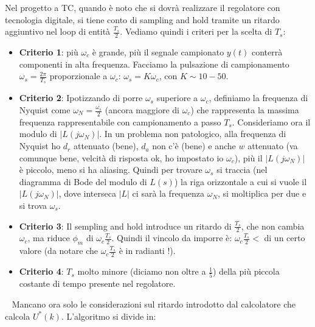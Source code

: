 \begin{landscape}
\begin{multicols*}{2}
    Nel progetto a TC, quando è noto che si dovrà realizzare il regolatore con tecnologia digitale, si tiene conto di sampling and hold tramite un ritardo aggiuntivo nel loop di entità $\frac{T_s}{2}$.\newline
    \newline
    Vediamo quindi i criteri per la scelta di $T_s$:
    \begin{itemize}
        \item \textbf{Criterio 1}: più $\omega_c$ è grande, più il segnale campionato $y(t)$ conterrà componenti in alta frequenza. Facciamo la pulsazione di campionamento $\omega_s = \frac{2\pi}{T_s}$ proporzionale a $\omega_c$: $\omega_s = K \omega_c$, con $K \sim 10 - 50$.
        \item \textbf{Criterio 2}: Ipotizzando di porre $\omega_s$ superiore a $\omega_c$, definiamo la frequenza di Nyquist come $\omega_N = \frac{\omega_s}{2}$ (ancora maggiore di $\omega_c$) che rappresenta la massima frequenza rappresentabile con campionamento a passo $T_s$.\newline
        Consideriamo ora il modulo di $|L(j \omega_N)|$. In un problema non patologico, alla frequenza di Nyquist ho $d_r$ attenuato (bene), $d_a$ non c'è (bene) e anche $w$ attenuato (va comunque bene, velcità di risposta ok, ho impostato io $\omega_c$), più il $|L(j \omega_N)|$ è piccolo, meno si ha aliasing.\newline
        \newline
        Quindi per trovare $\omega_s$ si traccia (nel diagramma di Bode del modulo di $L(s)$) la riga orizzontale a cui si vuole il $|L(j \omega_N)|$, dove interseca $|L|$ ci sarà la frequenza $\omega_N$, si moltiplica per due e si trova $\omega_s$.
        \item \textbf{Criterio 3}: Il sempling and hold introduce un ritardo di $\frac{T_s}{2}$, che non cambia $\omega_c$, ma riduce $\phi_m$ di $\omega_c \frac{T_s}{2}$. Quindi il vincolo da imporre è: $\omega_c \frac{T_s}{2} < $ di un certo valore (da notare che $\omega_c \frac{T_s}{2}$ è in radianti !).
        \item \textbf{Criterio 4}: $T_s$ molto minore (diciamo non oltre a $\frac{1}{5}$) della più piccola costante di tempo presente nel regolatore.
    \end{itemize}
    \ \newline
    Mancano ora solo le considerazioni sul ritardo introdotto dal calcolatore che calcola $U^*(k)$. L'algoritmo si divide in:
    \begin{itemize}

\end{itemize}
\end{multicols*}
\end{landscape}
